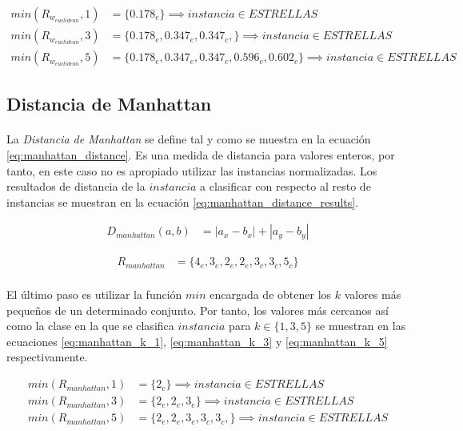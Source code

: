 \documentclass{article}
\begin{document}
			\begin{align}
			\label{eq:euclidean_weighted_k_1}
				min(R_{w_{euclidean}},1) &= \{ 0.178_e \}  \implies instancia \in ESTRELLAS \\
			\label{eq:euclidean_weighted_k_3}
				min(R_{w_{euclidean}},3) &= \{ 0.178_e, 0.347_e, 0.347_c,\}  \implies instancia \in ESTRELLAS \\
			\label{eq:euclidean_weighted_k_5}
				min(R_{w_{euclidean}},5) &= \{ 0.178_e, 0.347_e, 0.347_c, 0.596_e, 0.602_c\} \implies instancia \in ESTRELLAS
			\end{align}


		\subsection{Distancia de Manhattan}
		\label{sec:manhattan}

			\paragraph{}
			La \emph{Distancia de Manhattan} se define tal y como se muestra en la ecuación \eqref{eq:manhattan_distance}. Es una medida de distancia para valores enteros, por tanto, en este caso no es apropiado utilizar las instancias normalizadas. Los resultados de distancia de la $instancia$ a clasificar con respecto al resto de instancias se muestran en la ecuación \eqref{eq:manhattan_distance_results}.

			\begin{align}
			\label{eq:manhattan_distance}
				D_{manhattan}(a,b) &= |a_x - b_x| + |a_y - b_y|
			\end{align}

			\begin{align}
			\label{eq:manhattan_distance_results}
				R_{manhattan} &= \{4_e, 3_e, 2_e, 2_e, 3_c, 3_c, 5_c\}
			\end{align}

			\paragraph{}
			El último paso es utilizar la función $min$ encargada de obtener los $k$ valores más pequeños de un determinado conjunto. Por tanto, los valores más cercanos así como la clase en la que se clasifica $instancia$ para $k \in \{1,3,5\}$ se muestran en las ecuaciones \eqref{eq:manhattan_k_1}, \eqref{eq:manhattan_k_3} y \eqref{eq:manhattan_k_5} respectivamente.

			\begin{align}
			\label{eq:manhattan_k_1}
				min(R_{manhattan},1) &= \{ 2_e \}  \implies instancia \in ESTRELLAS \\
			\label{eq:manhattan_k_3}
				min(R_{manhattan},3) &= \{ 2_e, 2_e, 3_e\}  \implies instancia \in ESTRELLAS \\
			\label{eq:manhattan_k_5}
				min(R_{manhattan},5) &= \{ 2_e, 2_e, 3_e, 3_c, 3_c, \} \implies instancia \in ESTRELLAS
			\end{align}
\end{document}
